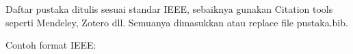 \documentclass{elsinta}
\begin{document}
\section{\ReferencesTitle}
Daftar pustaka ditulis sesuai standar IEEE, sebaiknya gunakan Citation tools seperti Mendeley, Zotero dll. Semuanya dimasukkan atau replace file pustaka.bib.

Contoh format IEEE:  
\renewcommand{\refname}{}      %




\section{\AbbrevTitle}
\end{document}
